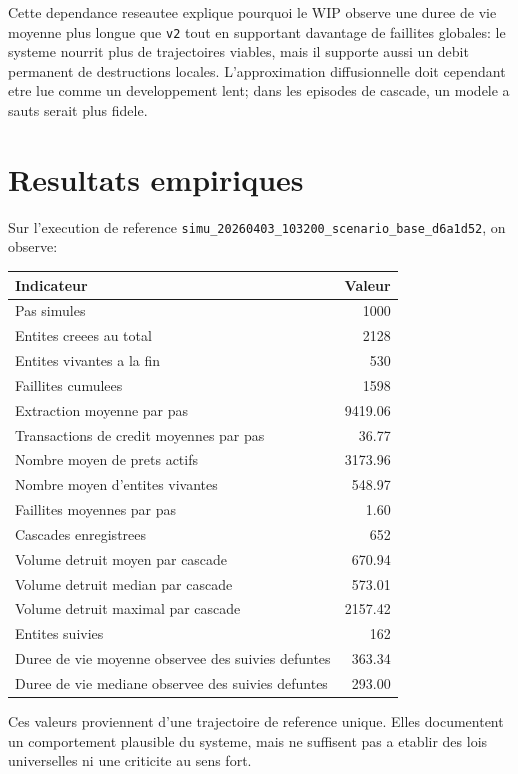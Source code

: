 \documentclass[11pt,a4paper]{article}
\begin{document}
Cette dependance reseautee explique pourquoi le WIP observe une duree de vie moyenne plus longue que \texttt{v2} tout en supportant davantage de faillites globales: le systeme nourrit plus de trajectoires viables, mais il supporte aussi un debit permanent de destructions locales. L'approximation diffusionnelle doit cependant etre lue comme un developpement lent; dans les episodes de cascade, un modele a sauts serait plus fidele.

\section{Resultats empiriques}
Sur l'execution de reference \texttt{simu\_20260403\_103200\_scenario\_base\_d6a1d52}, on observe:
\begin{center}
\begin{tabular}{lr}
\toprule
Indicateur & Valeur \\
\midrule
Pas simules & 1000 \\
Entites creees au total & 2128 \\
Entites vivantes a la fin & 530 \\
Faillites cumulees & 1598 \\
Extraction moyenne par pas & 9419.06 \\
Transactions de credit moyennes par pas & 36.77 \\
Nombre moyen de prets actifs & 3173.96 \\
Nombre moyen d'entites vivantes & 548.97 \\
Faillites moyennes par pas & 1.60 \\
Cascades enregistrees & 652 \\
Volume detruit moyen par cascade & 670.94 \\
Volume detruit median par cascade & 573.01 \\
Volume detruit maximal par cascade & 2157.42 \\
Entites suivies & 162 \\
Duree de vie moyenne observee des suivies defuntes & 363.34 \\
Duree de vie mediane observee des suivies defuntes & 293.00 \\
\bottomrule
\end{tabular}
\end{center}

Ces valeurs proviennent d'une trajectoire de reference unique. Elles documentent un comportement plausible du systeme, mais ne suffisent pas a etablir des lois universelles ni une criticite au sens fort.
\end{document}
